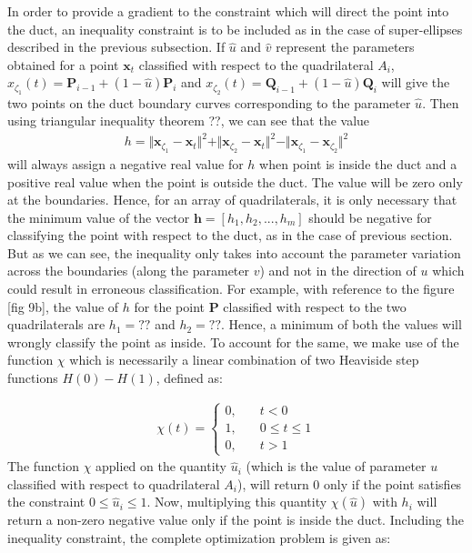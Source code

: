 \documentclass[12pt,a4]{article}
\begin{document}
In order to provide a gradient to the constraint which will direct the point into the duct, an inequality constraint is to be included as in the case of super-ellipses described in the previous subsection. If $\hat{u}$ and $\hat{v}$ represent the parameters obtained for a point $\mathbf{x}_t$ classified with respect to the quadrilateral $A_i$, $x_{\zeta_1}(t) = \mathbf{P}_{i-1}+\left(1-{\hat{u}} \right)\mathbf{P}_i$ and $x_{\zeta_2}(t) = \mathbf{Q}_{i-1}+\left(1-{\hat{u}} \right)\mathbf{Q}_i$ will give the two points on the duct boundary curves corresponding to the parameter $\hat{u}$. Then using triangular inequality theorem ??, we can see that the value
\begin{align}
\label{eq:ductgradientinquad}
h = \Vert \mathbf{x}_{\zeta_1}-\mathbf{x}_t\Vert^2+\Vert \mathbf{x}_{\zeta_2}-\mathbf{x}_t\Vert^2-\Vert \mathbf{x}_{\zeta_1}- \mathbf{x}_{\zeta_2}\Vert^2
\end{align}
will always assign a negative real value for $h$ when point is inside the duct and a positive real value when the point is outside the duct. The value will be zero only at the boundaries. Hence, for an array of quadrilaterals, it is only necessary that the minimum value of the vector $\mathbf{h} = [{h}_1, {h}_2,...,{h}_m]$ should be negative for classifying the point with respect to the duct, as in the case of previous section. But as we can see, the inequality only takes into account the parameter variation across the boundaries (along the parameter $v$) and not in the direction of $u$ which could result in erroneous classification. For example, with reference to the figure [fig 9b], the value of $h$ for the point $\mathbf{P}$ classified with respect to the two quadrilaterals are $h_1 = ??$ and $h_2 = ??$. Hence, a minimum of both the values will wrongly classify the point as inside. To account for the same, we make use of the function $\chi$ which is necessarily a linear combination of two Heaviside step functions $H(0)-H(1)$, defined as:

\begin{align}
\label{eq:chifunction}
\chi(t) = \left\lbrace \begin{matrix}
0,&\quad t<0 \\
1,&\quad 0\leq t \leq 1\\
0, &\quad t >1
\end{matrix}\right.
\end{align}
The function $\chi$ applied on the quantity $\hat{u}_i$ (which is the value of parameter ${u}$ classified with respect to quadrilateral $A_i$), will return 0 only if the point satisfies the constraint $0\leq \hat{u}_i\leq 1$. Now, multiplying this quantity $\chi(\hat{u})$ with $h_i$ will return a non-zero negative value only if the point is inside the duct. Including the inequality constraint, the complete optimization problem is given as:
\end{document}
